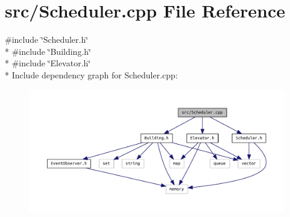 \section{src/\+Scheduler.cpp File Reference}
\label{_scheduler_8cpp}
{\ttfamily \#include \char`\"{}Scheduler.\+h\char`\"{}}\\*
{\ttfamily \#include \char`\"{}Building.\+h\char`\"{}}\\*
{\ttfamily \#include \char`\"{}Elevator.\+h\char`\"{}}\\*
Include dependency graph for Scheduler.\+cpp\+:\nopagebreak
\begin{figure}[H]
\begin{center}
\leavevmode
\includegraphics[width=350pt]{_scheduler_8cpp__incl}
\end{center}
\end{figure}
